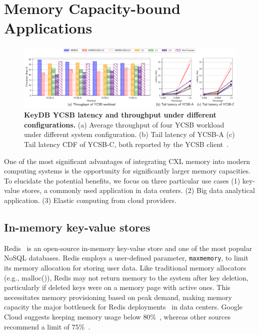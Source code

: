 
\section{Memory Capacity-bound Applications}
\label{sec:capacity}


\begin{figure}[t]
\centering
  \includegraphics[width=1\textwidth]{fig/cxl/redis_ycsb_cxl.pdf}
  \caption[KeyDB YCSB latency and throughput under different configurations]{\textbf{KeyDB YCSB latency and throughput under different configurations.} (a) Average throughput of four YCSB workload under different system configuration. (b) Tail latency of YCSB-A (c) Tail latency CDF of YCSB-C, both reported by the YCSB client~\cite{YCSB}.}
  \label{fig:ycsb_cxl}
\end{figure}

One of the most significant advantages of integrating CXL memory into modern computing systems is the opportunity for significantly larger memory capacities. To elucidate the potential benefits, we focus on three particular use cases (1) key-value stores, a commonly used application in data centers. (2) Big data analytical application. (3) Elastic computing from cloud providers.

\subsection{In-memory key-value stores}
\label{ssec:keydb}
Redis~\cite{redis} is an open-source in-memory key-value store and one of the most popular NoSQL databases. Redis employs a user-defined parameter, \texttt{maxmemory}, to limit its memory allocation for storing user data. Like traditional memory allocators (e.g., malloc()), Redis may not return memory to the system after key deletion, particularly if deleted keys were on a memory page with active ones. This necessitates memory provisioning based on peak demand, making memory capacity the major bottleneck for Redis deployments~\cite{manageredis} in data centers. Google Cloud suggests keeping memory usage below $80\%$~\cite{googlecloud}, whereas other sources recommend a limit of $75\%$~\cite{manageredis}. 

